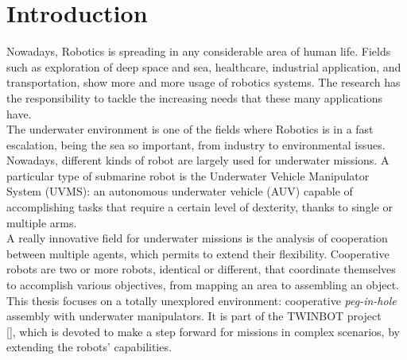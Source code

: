 

\chapter{Introduction}
\label{chap:introduction}
\ifpdf
    \graphicspath{{Introduction/Figures/PNG/}{Introduction/Figures/PDF/}{Introduction/Figures/}}
\else
    \graphicspath{{Introduction/Figures/EPS/}{Introduction/Figures/}}
\fi

Nowadays, Robotics is spreading in any considerable area of human life. Fields such as exploration of deep space and sea, healthcare, industrial application, and transportation, show more and more usage of robotics systems. The research has the responsibility to tackle the increasing needs that these many applications have.\\

The underwater environment is one of the fields where Robotics is in a fast escalation, being the sea so important, from industry to environmental issues. Nowadays, different kinds of robot are largely used for underwater missions. A particular type of submarine robot is the Underwater Vehicle Manipulator System (UVMS): an autonomous underwater vehicle (AUV) capable of accomplishing tasks that require a certain level of dexterity, thanks to single or multiple arms.\\
A really innovative field for underwater missions is the analysis of cooperation between multiple agents, which permits to extend their flexibility. Cooperative robots are two or more robots, identical or different, that coordinate themselves to accomplish various objectives, from mapping an area to assembling an object.\\
This thesis focuses on a totally unexplored environment: cooperative \textit{peg-in-hole} assembly with underwater manipulators. It is part of the TWINBOT project \\ \mbox{[\cite{TWINBOT2019}]}, which is devoted to make a step forward for missions in complex scenarios, by extending the robots' capabilities.\\

